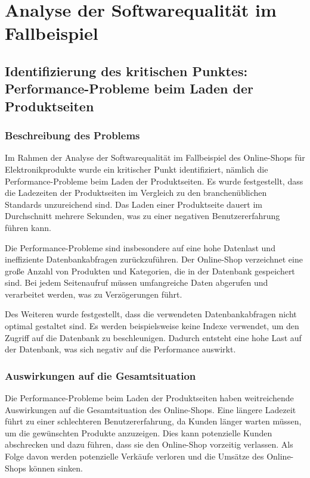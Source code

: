 \section{Analyse der Softwarequalität im Fallbeispiel}

\subsection{Identifizierung des kritischen Punktes: Performance-Probleme beim Laden der Produktseiten}

\subsubsection{Beschreibung des Problems}

Im Rahmen der Analyse der Softwarequalität im Fallbeispiel des Online-Shops für Elektronikprodukte wurde ein kritischer Punkt identifiziert, nämlich die Performance-Probleme beim Laden der Produktseiten. Es wurde festgestellt, dass die Ladezeiten der Produktseiten im Vergleich zu den branchenüblichen Standards unzureichend sind. Das Laden einer Produktseite dauert im Durchschnitt mehrere Sekunden, was zu einer negativen Benutzererfahrung führen kann.

Die Performance-Probleme sind insbesondere auf eine hohe Datenlast und ineffiziente Datenbankabfragen zurückzuführen. Der Online-Shop verzeichnet eine große Anzahl von Produkten und Kategorien, die in der Datenbank gespeichert sind. Bei jedem Seitenaufruf müssen umfangreiche Daten abgerufen und verarbeitet werden, was zu Verzögerungen führt.

Des Weiteren wurde festgestellt, dass die verwendeten Datenbankabfragen nicht optimal gestaltet sind. Es werden beispielsweise keine Indexe verwendet, um den Zugriff auf die Datenbank zu beschleunigen. Dadurch entsteht eine hohe Last auf der Datenbank, was sich negativ auf die Performance auswirkt.

\subsubsection{Auswirkungen auf die Gesamtsituation}

Die Performance-Probleme beim Laden der Produktseiten haben weitreichende Auswirkungen auf die Gesamtsituation des Online-Shops. Eine längere Ladezeit führt zu einer schlechteren Benutzererfahrung, da Kunden länger warten müssen, um die gewünschten Produkte anzuzeigen. Dies kann potenzielle Kunden abschrecken und dazu führen, dass sie den Online-Shop vorzeitig verlassen. Als Folge davon werden potenzielle Verkäufe verloren und die Umsätze des Online-Shops können sinken.


